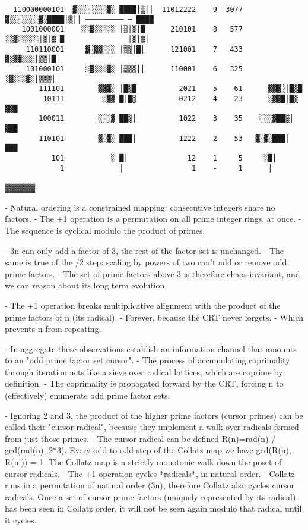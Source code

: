 \documentclass[12pt]{article}
\theoremstyle{plain}
\theoremstyle{definition}
\begin{document}
\begin{lstlisting}
  110000000101  ▓░░░░░░░▓░ ████│▒││  11012222    9  3077    ▓░░░░░░░▓░████│▒││ ───────── ─ ████            
    1001000001    ░░▓░░░░░ │▒│▒│█      210101    8   577     ░░▓░░░░░│▒│▒│█               │▒│▒│            
     110110001     ▓░▓▓░░░ │▒▒│█│      121001    7   433     ▓░▓▓░░░│▒▒│█│                                      
     101000101     ░▓░░░▓░ │▒▒▒││      110001    6   325    ░▓░░░▓░│▒▒▒││                                                 
        111101        ▓▓▓░ │█▒█          2021    5    61      ▓▓▓░│█▒█                                     
         10111         ░▓▓ █│█▒          0212    4    23      ░▓▓█│█▒                                   ▓▓█
        100011        ░░░▓ ██▒│          1022    3    35    ░░░▓██▒│                                    ▓██
        110101        ▓░▓░ ███│          1222    2    53   ▓░▓░███│                                     ███
           101           ░ █│              12    1     5     ░█│                                                    
             1             │                1    -     1      │                                                              
\end{lstlisting}

▓▓▓▓▓






- Natural ordering is a constrained mapping: consecutive integers share no factors.
- The +1 operation is a permutation on all prime integer rings, at once.
- The sequence is cyclical modulo the product of primes.

- 3n can only add a factor of 3, the rest of the factor set is unchanged.
- The same is true of the /2 step: scaling by powers of two can't add or remove odd prime factors.
- The set of prime factors above 3 is therefore chaos-invariant, and we can reason about its long term evolution.

- The +1 operation breaks multiplicative alignment with the product of the prime factors of n (its radical).
- Forever, because the CRT never forgets.
- Which prevents n from repeating.

- In aggregate these observations establish an information channel that amounts to an "odd prime factor set cursor".
- The process of accumulating coprimality through iteration acts like a sieve over radical lattices, which are coprime by definition.
- The coprimality is propagated forward by the CRT, forcing n to (effectively) enumerate odd prime factor sets.

- Ignoring 2 and 3, the product of the higher prime factors (cursor primes) can be called their "cursor radical", because they implement a walk over radicals formed from just those primes. 
- The cursor radical can be defined R(n)=rad(n) / gcd(rad(n), 2*3). Every odd-to-odd step of the Collatz map we have gcd(R(n), R(n')) = 1. The Collatz map is a strictly monotonic walk down the poset of cursor radicals.
- The +1 operation cycles *radicals*, in natural order.
- Collatz runs in a permutation of natural order (3n), therefore Collatz also cycles cursor radicals. Once a set of cursor prime factors (uniquely represented by its radical) has been seen in Collatz order, it will not be seen again modulo that radical until it cycles.
\end{document}
